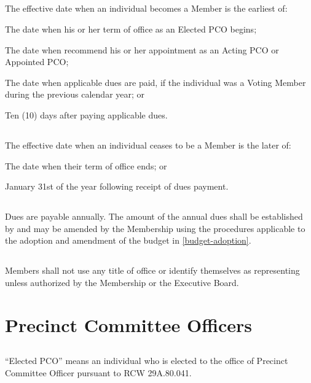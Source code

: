 \subsection{}
The effective date when an individual becomes a Member is the earliest of:
\begin{alphalist}
    \item The date when his or her term of office as an Elected PCO begins;
    \item The date when \thedistrict{} recommend his or her appointment as an Acting PCO or
Appointed PCO;
    \item The date when applicable dues are paid, if the individual was a Voting Member during the previous
calendar year; or
    \item Ten (10) days after paying applicable dues.
\end{alphalist}

\subsection{}
The effective date when an individual ceases to be a Member is the later of:
\begin{alphalist}
    \item The date when their term of office ends; or
    \item January 31st of the year following receipt of dues payment.
\end{alphalist}

\subsection{}
Dues are payable annually. The amount of the annual dues shall be established by and may be amended by the Membership using the procedures applicable to the adoption and amendment of the budget in \autoref{budget-adoption}.

\subsection{}
Members shall not use any title of office or identify themselves as representing \thedistrict{} unless authorized by the Membership or the Executive Board.

\section{Precinct Committee Officers}
\subsection{} \label{elected-pco}
“Elected PCO” means an individual who is elected to the office of Precinct Committee Officer pursuant to RCW 29A.80.041.

